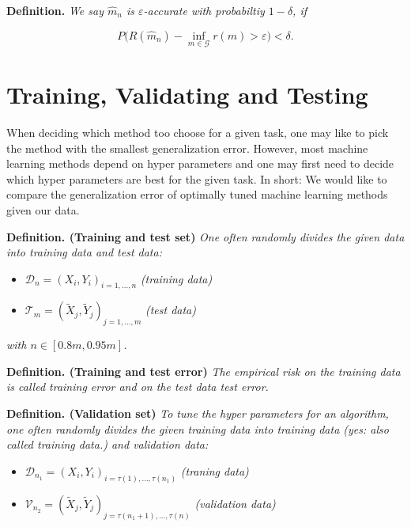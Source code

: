 \documentclass[
]{book}
\providecommand{\tightlist}{%
  \setlength{\itemsep}{0pt}\setlength{\parskip}{0pt}}
\begin{document}
\textbf{Definition.} \emph{We say \(\hat{m}_n\) is \(\varepsilon\)-accurate with probabiltiy \(1-\delta\), if}

\[
P\Big(R(\hat{m}_n)-\inf_{m\in\mathcal{G}}r(m)>\varepsilon\Big)<\delta.
\]

\hypertarget{training-validating-and-testing}{%
\section{Training, Validating and Testing}\label{training-validating-and-testing}}

When deciding which method too choose for a given task, one may like to pick the method with the smallest generalization error. However, most machine learning methods depend on hyper parameters and one may first need to decide which hyper parameters are best for the given task. In short: We would like to compare the generalization error of optimally tuned machine learning methods given our data.

\textbf{Definition. (Training and test set)} \emph{One often randomly divides the given data into training data and test data:}

\begin{itemize}
\tightlist
\item
  \(\mathcal{D}_n=(X_i,Y_i)_{i=1,...,n}\) \emph{(training data)}
\item
  \(\mathcal{T}_m=(\tilde{X}_j,\tilde{Y}_j)_{j=1,...,m}\) \emph{(test data)}
\end{itemize}

\emph{with \(n\in[0.8m,0.95m]\).}

\textbf{Definition. (Training and test error)} \emph{The empirical risk on the training data is called training error and on the test data test error.}

\textbf{Definition. (Validation set)} \emph{To tune the hyper parameters for an algorithm, one often randomly divides the given training data into training data (yes: also called training data.) and validation data:}

\begin{itemize}
\tightlist
\item
  \(\mathcal{D}_{n_1}=(X_i,Y_i)_{i=\tau(1),...,\tau(n_1)}\) \emph{(traning data)}
\item
  \(\mathcal{V}_{n_2}=(\tilde{X}_j,\tilde{Y}_j)_{j=\tau(n_1+1),...,\tau(n)}\) \emph{(validation data)}
\end{itemize}
\end{document}
